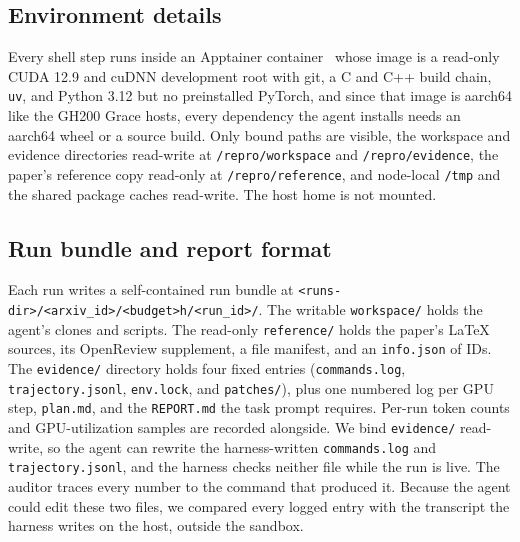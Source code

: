 
\subsection{Environment details}
\label{app:sandbox}

Every shell step runs inside an Apptainer
container~\citep{kurtzer2017singularity} whose image is a read-only CUDA 12.9
and cuDNN development root with git, a C and C++ build chain, \texttt{uv}, and
Python 3.12 but no preinstalled PyTorch, and since that image is aarch64 like the
GH200 Grace hosts, every dependency the agent installs needs an aarch64 wheel or
a source build. Only bound paths are visible, the
workspace and evidence directories read-write at \texttt{/repro/workspace} and
\texttt{/repro/evidence}, the paper's reference copy read-only at
\texttt{/repro/reference}, and node-local \texttt{/tmp} and the shared package
caches read-write. The host home is not mounted.

\subsection{Run bundle and report format}
\label{app:report-format}

Each run writes a self-contained run bundle at
\texttt{<runs-dir>/\allowbreak<arxiv\_id>/\allowbreak<budget>h/\allowbreak<run\_id>/}.
The writable \texttt{workspace/} holds the agent's clones and scripts. The
read-only \texttt{reference/} holds the paper's LaTeX sources, its OpenReview
supplement, a file manifest, and an \texttt{info.json} of IDs. The
\texttt{evidence/} directory holds four fixed entries (\texttt{commands.log},
\texttt{trajectory.jsonl}, \texttt{env.lock}, and \texttt{patches/}), plus
one numbered log per GPU step, \texttt{plan.md}, and the \texttt{REPORT.md}
the task prompt requires. Per-run token counts and GPU-utilization samples are
recorded alongside. We bind \texttt{evidence/} read-write, so the agent
can rewrite the harness-written \texttt{commands.log} and
\texttt{trajectory.jsonl}, and the harness checks neither file while the run
is live. The auditor traces every number to the command that produced it.
Because the agent could edit these two files, we compared every logged entry
with the transcript the harness writes on the host, outside the sandbox.


